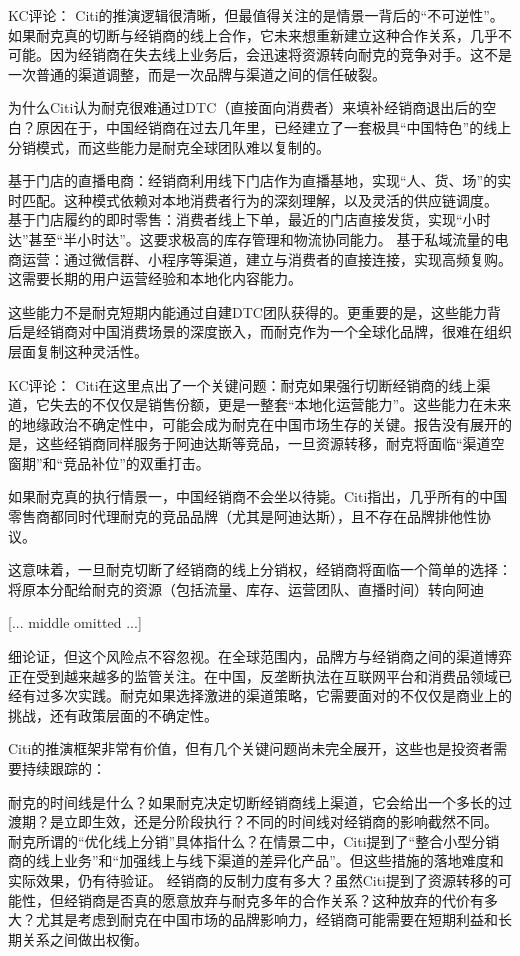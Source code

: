\documentclass[11pt]{ctexart}
\begin{document}
KC评论： Citi的推演逻辑很清晰，但最值得关注的是情景一背后的“不可逆性”。如果耐克真的切断与经销商的线上合作，它未来想重新建立这种合作关系，几乎不可能。因为经销商在失去线上业务后，会迅速将资源转向耐克的竞争对手。这不是一次普通的渠道调整，而是一次品牌与渠道之间的信任破裂。

为什么Citi认为耐克很难通过DTC（直接面向消费者）来填补经销商退出后的空白？原因在于，中国经销商在过去几年里，已经建立了一套极具“中国特色”的线上分销模式，而这些能力是耐克全球团队难以复制的。

基于门店的直播电商：经销商利用线下门店作为直播基地，实现“人、货、场”的实时匹配。这种模式依赖对本地消费者行为的深刻理解，以及灵活的供应链调度。 基于门店履约的即时零售：消费者线上下单，最近的门店直接发货，实现“小时达”甚至“半小时达”。这要求极高的库存管理和物流协同能力。 基于私域流量的电商运营：通过微信群、小程序等渠道，建立与消费者的直接连接，实现高频复购。这需要长期的用户运营经验和本地化内容能力。

这些能力不是耐克短期内能通过自建DTC团队获得的。更重要的是，这些能力背后是经销商对中国消费场景的深度嵌入，而耐克作为一个全球化品牌，很难在组织层面复制这种灵活性。

KC评论： Citi在这里点出了一个关键问题：耐克如果强行切断经销商的线上渠道，它失去的不仅仅是销售份额，更是一整套“本地化运营能力”。这些能力在未来的地缘政治不确定性中，可能会成为耐克在中国市场生存的关键。报告没有展开的是，这些经销商同样服务于阿迪达斯等竞品，一旦资源转移，耐克将面临“渠道空窗期”和“竞品补位”的双重打击。

如果耐克真的执行情景一，中国经销商不会坐以待毙。Citi指出，几乎所有的中国零售商都同时代理耐克的竞品品牌（尤其是阿迪达斯），且不存在品牌排他性协议。

这意味着，一旦耐克切断了经销商的线上分销权，经销商将面临一个简单的选择：将原本分配给耐克的资源（包括流量、库存、运营团队、直播时间）转向阿迪

[... middle omitted ...]

细论证，但这个风险点不容忽视。在全球范围内，品牌方与经销商之间的渠道博弈正在受到越来越多的监管关注。在中国，反垄断执法在互联网平台和消费品领域已经有过多次实践。耐克如果选择激进的渠道策略，它需要面对的不仅仅是商业上的挑战，还有政策层面的不确定性。

Citi的推演框架非常有价值，但有几个关键问题尚未完全展开，这些也是投资者需要持续跟踪的：

耐克的时间线是什么？如果耐克决定切断经销商线上渠道，它会给出一个多长的过渡期？是立即生效，还是分阶段执行？不同的时间线对经销商的影响截然不同。 耐克所谓的“优化线上分销”具体指什么？在情景二中，Citi提到了“整合小型分销商的线上业务”和“加强线上与线下渠道的差异化产品”。但这些措施的落地难度和实际效果，仍有待验证。 经销商的反制力度有多大？虽然Citi提到了资源转移的可能性，但经销商是否真的愿意放弃与耐克多年的合作关系？这种放弃的代价有多大？尤其是考虑到耐克在中国市场的品牌影响力，经销商可能需要在短期利益和长期关系之间做出权衡。
\end{document}

